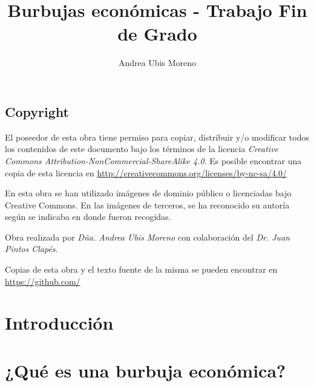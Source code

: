 \documentclass[a4paper,11pt]{scrbook} %
\title{Burbujas económicas - Trabajo Fin de Grado}
\author{Andrea Ubis Moreno}
\begin{document}



\section*{Copyright}
El poseedor de esta obra tiene permiso para copiar, distribuir y/o modificar todos los contenidos de este documento bajo los términos de la licencia \emph{Creative Commons Attribution-NonCommercial-ShareAlike 4.0}. Es posible encontrar una copia de esta licencia en \url{http://creativecommons.org/licenses/by-nc-sa/4.0/}

En esta obra se han utilizado imágenes de dominio público o licenciadas bajo Creative Commons. En las imágenes de terceros, se ha reconocido su autoría según se indicaba en donde fueron recogidas.

Obra realizada por \emph{Dña. Andrea Ubis Moreno} con colaboración del \emph{Dr. Juan Pintos Clapés}.

Copias de esta obra y el texto fuente de la misma se pueden encontrar en \url{https://github.com/}


\frontmatter                                              %





\tableofcontents

\listoffigures
\listoftables

\chapter{Introducción}




\mainmatter                                               %

\chapter{¿Qué es una burbuja económica?}

\end{document}
